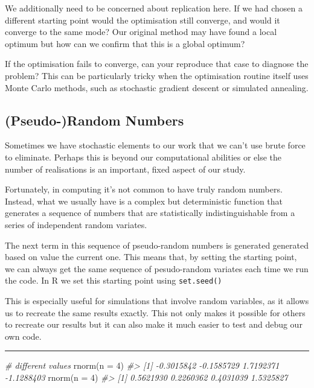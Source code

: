 \documentclass[
  12pt,
]{book}
\newenvironment{Shaded}{\begin{snugshade}}{\end{snugshade}}
\newcommand{\AttributeTok}[1]{\textcolor[rgb]{0.77,0.63,0.00}{#1}}
\newcommand{\CommentTok}[1]{\textcolor[rgb]{0.56,0.35,0.01}{\textit{#1}}}
\newcommand{\DecValTok}[1]{\textcolor[rgb]{0.00,0.00,0.81}{#1}}
\newcommand{\FunctionTok}[1]{\textcolor[rgb]{0.00,0.00,0.00}{#1}}
\newcommand{\NormalTok}[1]{#1}
\begin{document}
We additionally need to be concerned about replication here. If we had chosen a different starting point would the optimisation still converge, and would it converge to the same mode? Our original method may have found a local optimum but how can we confirm that this is a global optimum?

If the optimisation fails to converge, can your reproduce that case to diagnose the problem? This can be particularly tricky when the optimisation routine itself uses Monte Carlo methods, such as stochastic gradient descent or simulated annealing.

\hypertarget{pseudo-random-numbers}{%
\subsection{(Pseudo-)Random Numbers}\label{pseudo-random-numbers}}

Sometimes we have stochastic elements to our work that we can't use brute force to eliminate. Perhaps this is beyond our computational abilities or else the number of realisations is an important, fixed aspect of our study.

Fortunately, in computing it's not common to have truly random numbers. Instead, what we usually have is a complex but deterministic function that generates a sequence of numbers that are statistically indistinguishable from a series of independent random variates.

The next term in this sequence of pseudo-random numbers is generated generated based on value the current one. This means that, by setting the starting point, we can always get the same sequence of pesudo-random variates each time we run the code. In R we set this starting point using \texttt{set.seed()}

This is especially useful for simulations that involve random variables, as it allows us to recreate the same results exactly. This not only makes it possible for others to recreate our results but it can also make it much easier to test and debug our own code.

\begin{center}\rule{0.5\linewidth}{0.5pt}\end{center}

\begin{Shaded}
\begin{Highlighting}[]
\CommentTok{\# different values}
\FunctionTok{rnorm}\NormalTok{(}\AttributeTok{n =} \DecValTok{4}\NormalTok{)}
\CommentTok{\#\textgreater{} [1] {-}0.3015842 {-}0.1585729  1.7192371 {-}1.1288403}
\FunctionTok{rnorm}\NormalTok{(}\AttributeTok{n =} \DecValTok{4}\NormalTok{)}
\CommentTok{\#\textgreater{} [1] 0.5621930 0.2260362 0.4031039 1.5325827}
\end{Highlighting}
\end{Shaded}
\end{document}
